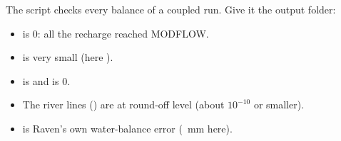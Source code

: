 \label{st:audit}
The script  checks every balance of a coupled run. Give it the output folder:
\begin{tocheck}
\begin{itemize}
\item {} is 0: all the recharge reached MODFLOW.
\item {} is very small (here ).
\item {} is  and  is 0.
\item The river lines () are at round-off level (about $10^{-10}$ or smaller).
\item {} is Raven's own water-balance error (~mm here).
\end{itemize}
\end{tocheck}

